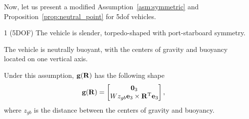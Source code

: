Now, let us present a modified Assumption~\ref{asm:symmetric} and Proposition~\ref{prop:neutral_point} for 5\gls{dof} vehicles.

\begin{customasm}{1 (5DOF)}
    The vehicle is slender, torpedo-shaped with port-starboard symmetry.
\end{customasm}

\begin{asm}
    \label{asm:buoyancy}
    The vehicle is neutrally buoyant, with the centers of gravity and buoyancy located on one vertical axis.
\end{asm}
\noindent Under this assumption, $\mathbf{g}(\mathbf{R})$ has the following shape
\begin{align}
    \mathbf{g}(\mathbf{R}) &= \begin{bmatrix}
        \mathbf{0}_3 \\ Wz_{gb} \mathbf{e}_3 \times \mathbf{R}^{\mathrm{T}} \mathbf{e}_3
    \end{bmatrix},
    \label{eq:gravity}
\end{align}
where $z_{gb}$ is the distance between the centers of gravity and buoyancy.
